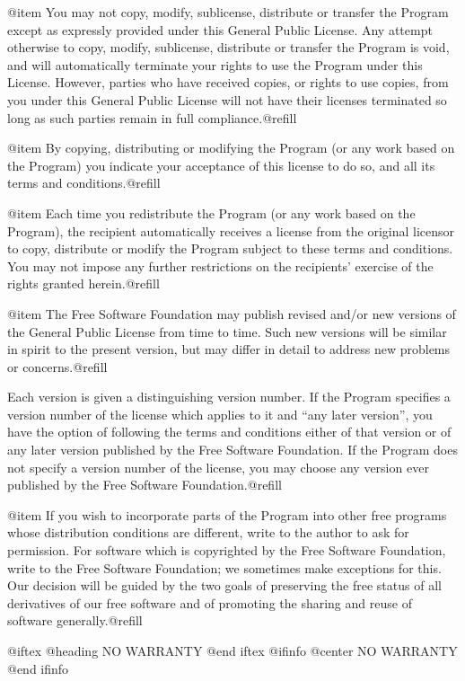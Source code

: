 @item
You may not copy, modify, sublicense, distribute or transfer the
Program except as expressly provided under this General Public License.
Any attempt otherwise to copy, modify, sublicense, distribute or transfer
the Program is void, and will automatically terminate your rights to use
the Program under this License.  However, parties who have received
copies, or rights to use copies, from you under this General Public
License will not have their licenses terminated so long as such parties
remain in full compliance.@refill

@item
By copying, distributing or modifying the Program (or any work based
on the Program) you indicate your acceptance of this license to do so,
and all its terms and conditions.@refill

@item
Each time you redistribute the Program (or any work based on the
Program), the recipient automatically receives a license from the original
licensor to copy, distribute or modify the Program subject to these
terms and conditions.  You may not impose any further restrictions on the
recipients' exercise of the rights granted herein.@refill

@item
The Free Software Foundation may publish revised and/or new versions
of the General Public License from time to time.  Such new versions will
be similar in spirit to the present version, but may differ in detail to
address new problems or concerns.@refill

Each version is given a distinguishing version number.  If the Program
specifies a version number of the license which applies to it and ``any
later version'', you have the option of following the terms and conditions
either of that version or of any later version published by the Free
Software Foundation.  If the Program does not specify a version number of
the license, you may choose any version ever published by the Free Software
Foundation.@refill

@item
If you wish to incorporate parts of the Program into other free
programs whose distribution conditions are different, write to the author
to ask for permission.  For software which is copyrighted by the Free
Software Foundation, write to the Free Software Foundation; we sometimes
make exceptions for this.  Our decision will be guided by the two goals
of preserving the free status of all derivatives of our free software and
of promoting the sharing and reuse of software generally.@refill

@iftex
@heading NO WARRANTY
@end iftex
@ifinfo
@center NO WARRANTY
@end ifinfo

